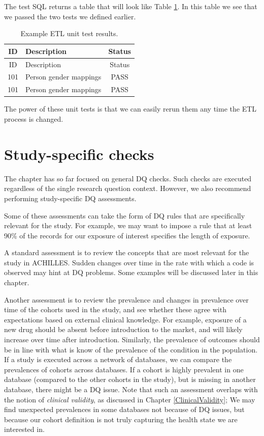\documentclass[11pt]{book}
\theoremstyle{definition}
\theoremstyle{definition}
\theoremstyle{definition}
\theoremstyle{remark}
\begin{document}
The test SQL returns a table that will look like Table \ref{tab:exampleTestResults}. In this table we see that we passed the two tests we defined earlier.

\begin{longtable}[]{@{}clc@{}}
\caption{\label{tab:exampleTestResults} Example ETL unit test results.}\tabularnewline
\toprule
ID & Description & Status\tabularnewline
\midrule
\endfirsthead
\toprule
ID & Description & Status\tabularnewline
\midrule
\endhead
101 & Person gender mappings & PASS\tabularnewline
101 & Person gender mappings & PASS\tabularnewline
\bottomrule
\end{longtable}

The power of these unit tests is that we can easily rerun them any time the ETL process is changed.

\hypertarget{study-specific-checks}{%
\section{Study-specific checks}\label{study-specific-checks}}

The chapter has so far focused on general DQ checks. Such checks are executed regardless of the single research question context. However, we also recommend performing study-specific DQ assessments.

Some of these assessments can take the form of DQ rules that are specifically relevant for the study. For example, we may want to impose a rule that at least 90\% of the records for our exposure of interest specifies the length of exposure.

A standard assessment is to review the concepts that are most relevant for the study in ACHILLES. Sudden changes over time in the rate with which a code is observed may hint at DQ problems. Some examples will be discussed later in this chapter.

Another assessment is to review the prevalence and changes in prevalence over time of the cohorts used in the study, and see whether these agree with expectations based on external clinical knowledge. For example, exposure of a new drug should be absent before introduction to the market, and will likely increase over time after introduction. Similarly, the prevalence of outcomes should be in line with what is know of the prevalence of the condition in the population. If a study is executed across a network of databases, we can compare the prevalences of cohorts across databases. If a cohort is highly prevalent in one database (compared to the other cohorts in the study), but is missing in another database, there might be a DQ issue. Note that such an assessment overlaps with the notion of \emph{clinical validity}, as discussed in Chapter \ref{ClinicalValidity}; We may find unexpected prevalences in some databases not because of DQ issues, but because our cohort definition is not truly capturing the health state we are interested in.
\end{document}
